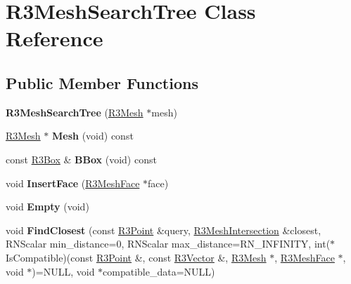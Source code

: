 \hypertarget{class_r3_mesh_search_tree}{}\section{R3\+Mesh\+Search\+Tree Class Reference}
\label{class_r3_mesh_search_tree}
\subsection*{Public Member Functions}
\begin{DoxyCompactItemize}
\item 
{\bfseries R3\+Mesh\+Search\+Tree} (\hyperlink{class_r3_mesh}{R3\+Mesh} $\ast$mesh)\hypertarget{class_r3_mesh_search_tree_a676e1e9e8eb4b11b56104e425bbba093}{}\label{class_r3_mesh_search_tree_a676e1e9e8eb4b11b56104e425bbba093}

\item 
\hyperlink{class_r3_mesh}{R3\+Mesh} $\ast$ {\bfseries Mesh} (void) const \hypertarget{class_r3_mesh_search_tree_a2358f7cb7db30ea3c61bdaac938c325b}{}\label{class_r3_mesh_search_tree_a2358f7cb7db30ea3c61bdaac938c325b}

\item 
const \hyperlink{class_r3_box}{R3\+Box} \& {\bfseries B\+Box} (void) const \hypertarget{class_r3_mesh_search_tree_a6fabf7a5602a532ef0af12ef41df5689}{}\label{class_r3_mesh_search_tree_a6fabf7a5602a532ef0af12ef41df5689}

\item 
void {\bfseries Insert\+Face} (\hyperlink{class_r3_mesh_face}{R3\+Mesh\+Face} $\ast$face)\hypertarget{class_r3_mesh_search_tree_ad4bb54af5a86e182cca6bd6646dd3ce1}{}\label{class_r3_mesh_search_tree_ad4bb54af5a86e182cca6bd6646dd3ce1}

\item 
void {\bfseries Empty} (void)\hypertarget{class_r3_mesh_search_tree_a4d55e2552421067d53cec4d462a90150}{}\label{class_r3_mesh_search_tree_a4d55e2552421067d53cec4d462a90150}

\item 
void {\bfseries Find\+Closest} (const \hyperlink{class_r3_point}{R3\+Point} \&query, \hyperlink{struct_r3_mesh_intersection}{R3\+Mesh\+Intersection} \&closest, R\+N\+Scalar min\+\_\+distance=0, R\+N\+Scalar max\+\_\+distance=R\+N\+\_\+\+I\+N\+F\+I\+N\+I\+TY, int($\ast$Is\+Compatible)(const \hyperlink{class_r3_point}{R3\+Point} \&, const \hyperlink{class_r3_vector}{R3\+Vector} \&, \hyperlink{class_r3_mesh}{R3\+Mesh} $\ast$, \hyperlink{class_r3_mesh_face}{R3\+Mesh\+Face} $\ast$, void $\ast$)=N\+U\+LL, void $\ast$compatible\+\_\+data=N\+U\+LL)\hypertarget{class_r3_mesh_search_tree_a7b8c20067931f2c9b2a1890c2b32b111}{}\label{class_r3_mesh_search_tree_a7b8c20067931f2c9b2a1890c2b32b111}


\end{DoxyCompactItemize}
